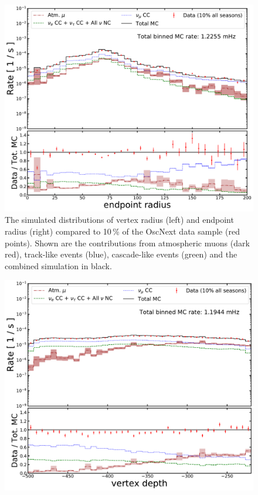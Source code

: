 \begin{appendices}
\begin{figure}[h]
    \includegraphics[width=0.75\linewidth]{figures/L7_SANTA_classifier_rho36end_14_bigger.pdf}
    \caption[The simulated distributions of vertex radius (left) and endpoint radius (right) compared to 10\,\% of the OscNext data sample]{The simulated distributions of vertex radius (left) and endpoint radius (right) compared to 10\,\% of the OscNext data sample (red points). Shown are the contributions from atmospheric muons (dark red), track-like events (blue), cascade-like events (green) and the combined simulation in black.}
    \label{fig:data_mc_rstart_rend}
\end{figure}

\begin{figure}[h]
	\centering
    \includegraphics[width=0.75\linewidth]{figures/L7_SANTA_classifier_zstart_14_bigger.pdf}
    

\end{figure}
\end{appendices}
